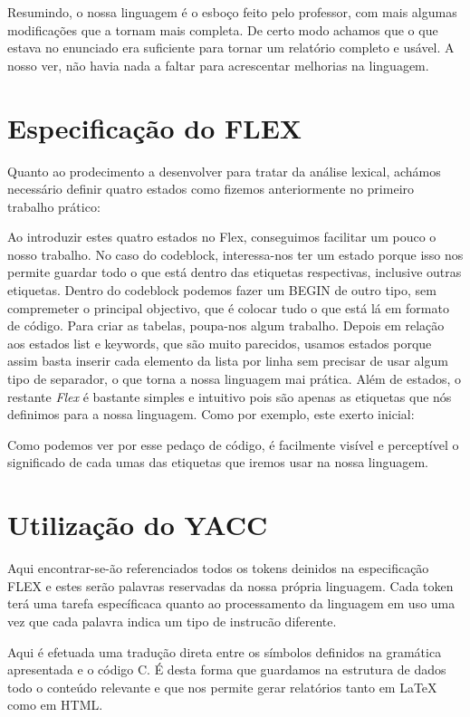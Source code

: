\documentclass[12pt,letterpaper]{article}
\begin{document}
Resumindo, o nossa linguagem é o esboço feito pelo professor, com mais algumas modificações que a tornam mais completa. De certo modo achamos que o que estava no enunciado era suficiente para tornar um relatório completo e usável. A nosso ver, não havia nada a faltar para acrescentar melhorias na linguagem.

\newpage
\section{Especificação do FLEX}
Quanto ao prodecimento a desenvolver para tratar da análise lexical, achámos necessário definir quatro estados como fizemos anteriormente no primeiro trabalho prático:

Ao introduzir estes quatro estados no Flex, conseguimos facilitar um pouco o nosso trabalho. No caso do codeblock, interessa-nos ter um estado porque isso nos permite guardar todo o que está dentro das etiquetas respectivas, inclusive outras etiquetas. Dentro do codeblock podemos fazer um BEGIN de outro tipo, sem compremeter o principal objectivo, que é colocar tudo o que está lá em formato de código. Para criar as tabelas, poupa-nos algum trabalho. Depois em relação aos estados list e keywords, que são muito parecidos, usamos estados porque assim basta inserir cada elemento da lista por linha sem precisar de usar algum tipo de separador, o que torna a nossa linguagem mai prática. Além de estados, o restante \textit{Flex} é bastante simples e intuitivo pois são apenas as etiquetas que nós definimos para a nossa linguagem. Como por exemplo, este exerto inicial:

Como podemos ver por esse pedaço de código, é facilmente visível e perceptível o significado de cada umas das etiquetas que iremos usar na nossa linguagem.

\newpage
\section{Utilização do YACC}
Aqui encontrar-se-ão referenciados todos os tokens deinidos na especificação FLEX e estes serão palavras reservadas da nossa própria linguagem. Cada token terá uma tarefa específicaca quanto ao processamento da linguagem em uso uma vez que cada palavra indica um tipo de instrucão diferente.

Aqui é efetuada uma tradução direta entre os símbolos definidos na gramática apresentada e o código C. É desta forma que guardamos na estrutura de dados todo o conteúdo relevante e que nos permite gerar relatórios tanto em LaTeX como em HTML.
\end{document}
